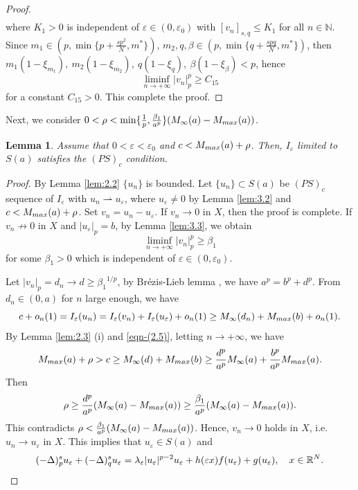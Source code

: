 \documentclass[10pt,a4paper]{amsart}
\numberwithin{equation}{section}
\newtheorem{lemma}[theorem]{Lemma}
\begin{document}
\begin{proof}
\begin{equation}
\begin{aligned}
\end{aligned}
\end{equation}
where $K_1>0$ is independent of $\varepsilon\in(0,\varepsilon_0)$ with 
$[v_n]_{{s,q}}\le K_1$ for all $n\in\mathbb{N}$.
Since $m_1\in(p,\min\{p+\frac{sp^2}{N},m^{*}\})$, 
$m_2, q,\beta\in(p,\min\{q+\frac{spq}{N},m^{*}\})$, then 
$m_1(1-\xi_{m_1}),~m_2(1-\xi_{m_2}),~q(1-\xi_{q}),~\beta(1-\xi_{\beta})<p$,
hence
\begin{equation}\label{eqn-(3.13)}
\liminf_{n\to +\infty} |v_n|_p^{p}\ge C_{15}
\end{equation}
for a constant $C_{15}>0$. This complete the proof.
\end{proof}

Next, we consider 
$0<\rho<\min\{{\frac{1}{p},\frac{\beta_1}{a^{p}}}\}(M_\infty(a)-M_{\rm max}(a))$.

\begin{lemma}\label{lem:3.4} 
Assume that $0<\varepsilon<\varepsilon_0$ and $c<M_{\rm max}(a)+\rho$. 
Then, $I_\varepsilon$ limited to $S(a)$ satisfies the $(PS)_c$ condition.
\end{lemma}

\begin{proof}
By Lemma \ref{lem:2.2} $\{u_n\}$ is bounded.  
Let $\{u_n\}\subset S(a)$ be $(PS)_c$ sequence of $I_\varepsilon$ with 
$u_n\rightharpoonup u_\varepsilon$, where $u_\varepsilon\neq 0$ by Lemma \ref{lem:3.2} 
and $c<M_{\rm max}(a)+\rho$. Set $v_n=u_n- u_\varepsilon$. If $v_n\to0$ in $X$, 
then the proof is complete.
If $v_n\not\to0$ in $X$ and $|u_\varepsilon|_{p}=b$, by Lemma \ref{lem:3.3}, 
we obtain
\begin{equation}\label{eqn-(3.14)}
\liminf_{n\to +\infty} |v_n|_p^{p}\ge \beta_1
\end{equation}
for some $\beta_1>0$ which is independent of $\varepsilon\in(0,\varepsilon_0)$.

Let $|v_n|_p=d_n\to d\ge{\beta_{1}}^{1/p}$, by Br\'ezis-Lieb lemma \cite{ref31},  
we have $a^{p}=b^{p}+d^{p}$. From $d_n\in(0,a)$ for $n$ large enough, we have
$$
c+o_n(1)=I_\varepsilon(u_n)=I_\varepsilon(v_n)+I_\varepsilon(u_\varepsilon)+o_n(1)
\ge M_\infty(d_n)+M_{\rm max}(b)+o_n(1).
$$
By Lemma \ref{lem:2.3} (i) and \eqref{eqn-(2.5)}, letting $n\to+\infty$, we have
$$
M_{\rm max}(a)+\rho>c\ge M_\infty(d)+M_{\rm max}(b)
\ge\frac{d^{p}}{a^{p}}M_\infty(a)+\frac{b^{p}}{a^{p}}M_{\rm max}(a).
$$
Then
$$
\rho\ge\frac{d^{p}}{a^{p}}(M_\infty(a)-M_{\rm max}(a))
\ge\frac{\beta_1}{a^{p}}(M_\infty(a)-M_{\rm max}(a)).
$$
This contradicts $\rho<\frac{\beta_1}{a^{p}}(M_\infty(a)-M_{\rm max}(a))$. 
Hence, $v_n \to 0 $ holds in $X$, i.e.\ $u_n \to u_\varepsilon$ in $X$. 
This implies that $u_\varepsilon \in S(a)$ and
\begin{equation*}
(-\Delta)_p^{s} u_\varepsilon+(-\Delta)_q^{s} u_\varepsilon
=\lambda_\varepsilon |u_\varepsilon|^{p-2}u_\varepsilon+h(\varepsilon x)
f(u_\varepsilon)+g(u_\varepsilon),\quad x\in\mathbb{R}^N. \qedhere
\end{equation*}
\end{proof}
\end{document}
